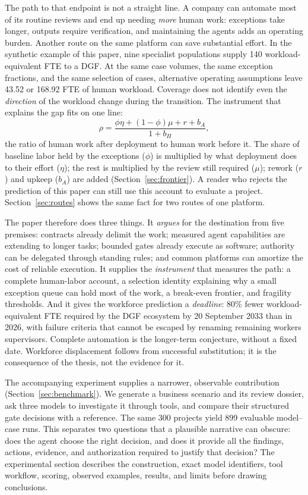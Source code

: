 The path to that endpoint is not a straight line. A company can automate most of its routine reviews
and end up needing \emph{more} human work: exceptions take longer, outputs require verification, and
maintaining the agents adds an operating burden. Another route on the same platform can save
substantial effort. In the synthetic example of this paper, nine specialist populations supply 140
workload-equivalent FTE to a DGF. At the same case volumes, the same exception fractions, and the
same selection of cases, alternative operating assumptions leave 43.52 or 168.92 FTE of human
workload. Coverage does not identify even the \emph{direction} of the workload change during the
transition. The instrument that explains the gap fits on one line:
\[
\rho=\frac{\phi\eta+(1-\phi)\mu+r+b_A}{1+b_H},
\]
the ratio of human work after deployment to human work before it. The share of baseline labor held by
the exceptions ($\phi$) is multiplied by what deployment does to their effort ($\eta$); the rest is
multiplied by the review still required ($\mu$); rework ($r$) and upkeep ($b_A$) are added
(Section~\ref{sec:frontier}). A reader who rejects the prediction of this paper can still use this
account to evaluate a project. Section~\ref{sec:routes} shows the same fact for two routes of one platform.

The paper therefore does three things. It \emph{argues} for the destination from five premises:
contracts already delimit the work; measured agent capabilities are extending to longer tasks; bounded
gates already execute as software; authority can be delegated through standing rules; and common
platforms can amortize the cost of reliable execution. It supplies the \emph{instrument} that measures
the path: a complete human-labor account, a selection identity explaining why a small exception queue
can hold most of the work, a break-even frontier, and fragility thresholds. And it gives the workforce prediction a
\emph{deadline}: 80\% fewer workload-equivalent FTE required by the DGF ecosystem by 20 September 2033 than in 2026,
with failure criteria that cannot be escaped by renaming remaining workers supervisors. Complete
automation is the longer-term conjecture, without a fixed date. Workforce displacement follows from successful
substitution; it is the consequence of the thesis, not the evidence for it.

The accompanying experiment supplies a narrower, observable contribution
(Section~\ref{sec:benchmark}). We generate a business scenario and its review dossier, ask three
models to investigate it through tools, and compare their structured gate decisions with a
reference. The same 300 projects yield 899 evaluable model--case runs. This separates two
questions that a plausible narrative can obscure: does the agent choose the right decision,
and does it provide all the findings, actions, evidence, and authorization required to justify
that decision? The experimental section describes the construction, exact model identifiers,
tool workflow, scoring, observed examples, results, and limits before drawing conclusions.

